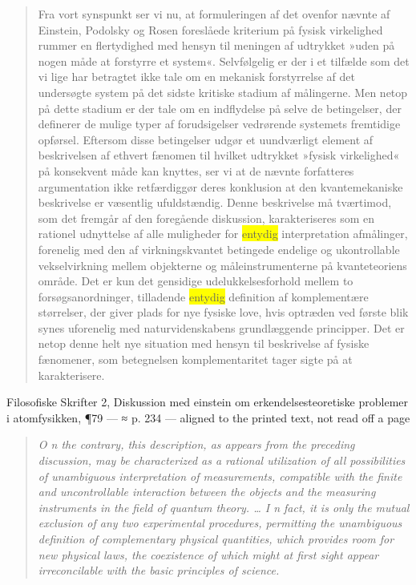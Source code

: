 \documentclass[11pt]{article}
\newcommand{\dcite}[1]{{\nopagebreak\raggedleft\small #1\par}\medskip}
\newcommand{\tlg}[1]{{\setlength{\fboxsep}{0.8pt}\colorbox{yellow}{#1}}}
\newcommand{\olg}[1]{{\setlength{\fboxsep}{0.8pt}\colorbox{cyan!25}{#1}}}
\begin{document}
\begin{quote}
Fra vort synspunkt ser vi nu, at formuleringen af det ovenfor nævnte af Einstein, Podolsky og Rosen foreslåede kriterium på fysisk virkelighed rummer en flertydighed med hensyn til meningen af udtrykket »uden på nogen måde at forstyrre et system«. Selvfølgelig er der i et tilfælde som det vi lige har betragtet ikke tale om en mekanisk forstyrrelse af det undersøgte system på det sidste kritiske stadium af målingerne. Men netop på dette stadium er der tale om en indflydelse på selve de betingelser, der definerer de mulige typer af forudsigelser vedrørende systemets fremtidige opførsel. Eftersom disse betingelser udgør et uundværligt element af beskrivelsen af ethvert fænomen til hvilket udtrykket »fysisk virkelighed« på konsekvent måde kan knyttes, ser vi at de nævnte forfatteres argumentation ikke retfærdiggør deres konklusion at den kvantemekaniske beskrivelse er væsentlig ufuldstændig. Denne beskrivelse må tværtimod, som det fremgår af den foregående diskussion, karakteriseres som en rationel udnyttelse af alle muligheder for \tlg{entydig} interpretation afmålinger, forenelig med den af virkningskvantet betingede endelige og ukontrollable vekselvirkning mellem objekterne og måleinstrumenterne på kvanteteoriens område. Det er kun det gensidige udelukkelsesforhold mellem to forsøgsanordninger, tilladende \tlg{entydig} definition af komplementære størrelser, der giver plads for nye fysiske love, hvis optræden ved første blik synes uforenelig med naturvidenskabens grundlæggende principper. Det er netop denne helt nye situation med hensyn til beskrivelse af fysiske fænomener, som betegnelsen komplementaritet tager sigte på at karakterisere.
\end{quote}
\dcite{Filosofiske Skrifter 2, Diskussion med einstein om erkendelsesteoretiske problemer i atomfysikken, ¶79 — ≈ p. 234 — aligned to the printed text, not read off a page}
{\footnotesize\begin{quote}\itshape
O n the contrary, this description, as appears from the preceding discussion, may be characterized as a rational utilization of all possibilities of \olg{unambiguous} interpretation of measurements, compatible with the finite and uncontrollable interaction between the objects and the measuring instruments in the field of quantum theory. … I n fact, it is only the mutual exclusion of any two experimental procedures, permitting the \olg{unambiguous} definition of complementary physical quantities, which provides room for new physical laws, the coexistence of which might at first sight appear irreconcilable with the basic principles of science.
\end{quote}}
\end{document}
